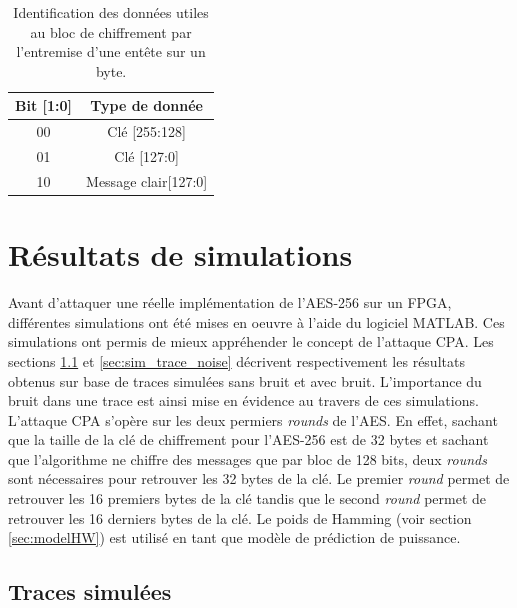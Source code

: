\documentclass[oneside]{book}
\begin{document}
\begin{table}[htbp]
	\centering
	\begin{tabular}{|c|c|}
    		\hline
  		  \textbf{Bit [1:0]} &\textbf{ Type de donnée} \\ \hline 
		  00 & Clé [255:128] \\ \hline 
  		  01 & Clé [127:0]  \\ \hline 
 		  10 & Message clair[127:0] \\ \hline
	\end{tabular}
    	\caption{Identification des données utiles au bloc de chiffrement par l'entremise d'une entête sur un byte.}
    	\label{tab:header} 
\end{table}
 
\newpage



\section{Résultats de simulations}
\label{sec:Sim_results_CPA}

Avant d'attaquer une réelle implémentation de l'AES-256 sur un FPGA, différentes simulations ont été mises en oeuvre à l'aide du logiciel MATLAB. Ces simulations ont permis de mieux appréhender le concept de l'attaque CPA. Les sections \ref{sec:sim_trace} et \ref{sec:sim_trace_noise} décrivent respectivement les résultats obtenus sur base de traces simulées sans bruit et avec bruit. L'importance du bruit dans une trace est ainsi mise en évidence au travers de ces simulations. L'attaque CPA s'opère sur les deux permiers \textit{rounds} de l'AES. En effet, sachant que la taille de la clé de chiffrement pour l'AES-256 est de 32 bytes et sachant que l'algorithme ne chiffre des messages que par bloc de 128 bits, deux \textit{rounds} sont nécessaires pour retrouver les 32 bytes de la clé. Le premier \textit{round} permet de retrouver les 16 premiers bytes de la clé tandis que le second \textit{round} permet de retrouver les 16 derniers bytes de la clé. Le poids de Hamming (voir section \ref{sec:modelHW}) est utilisé en tant que modèle de prédiction de puissance.

\subsection{Traces simulées}
\label{sec:sim_trace}
\end{document}
